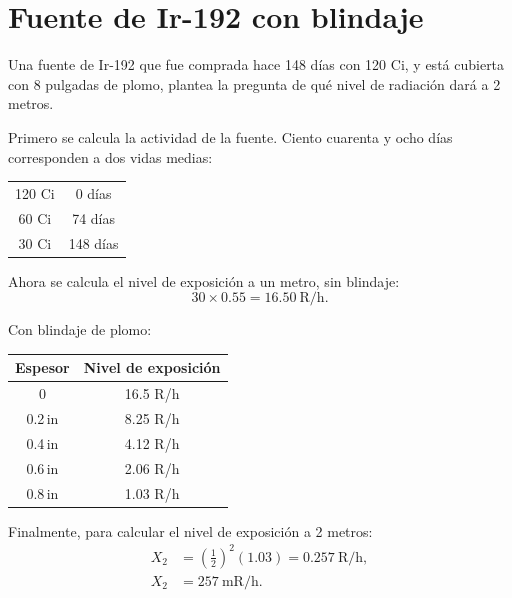 \section{Fuente de Ir-192 con blindaje}

Una fuente de Ir-192 que fue comprada hace 148 días con 120 Ci, y está cubierta con 8 pulgadas de plomo, plantea la pregunta de qué nivel de radiación dará a 2 metros.

Primero se calcula la actividad de la fuente. Ciento cuarenta y ocho días corresponden a dos vidas medias:
\begin{center}
\begin{tabular}{cc}
120 Ci & 0 días \\
60 Ci  & 74 días \\
30 Ci  & 148 días \\
\end{tabular}
\end{center}

Ahora se calcula el nivel de exposición a un metro, sin blindaje:
\[
30\times0.55=16.50\ \mathrm{R/h}.
\]

Con blindaje de plomo:
\begin{center}
\begin{tabular}{cc}
\textbf{Espesor} & \textbf{Nivel de exposición} \\
\hline
0       & 16.5 R/h \\
0.2\,in & 8.25 R/h \\
0.4\,in & 4.12 R/h \\
0.6\,in & 2.06 R/h \\
0.8\,in & 1.03 R/h \\
\end{tabular}
\end{center}

Finalmente, para calcular el nivel de exposición a 2 metros:
\begin{align*}
X_2&=\left(\frac{1}{2}\right)^2(1.03)=0.257\ \mathrm{R/h},\\
X_2&=257\ \mathrm{mR/h}.
\end{align*}
